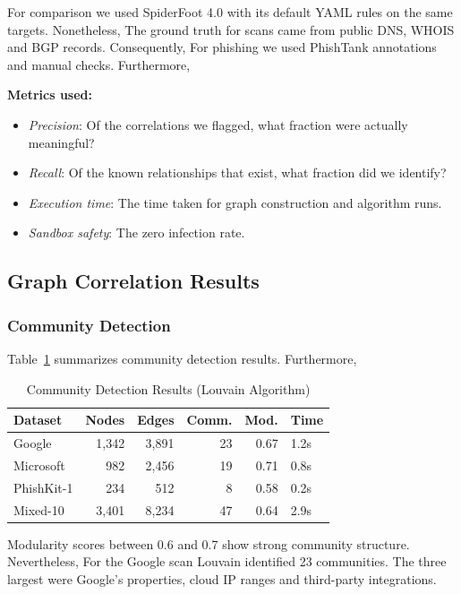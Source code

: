 \documentclass[conference]{IEEEtran}
\begin{document}
For comparison we used SpiderFoot 4.0 with its default YAML rules on the same targets. Nonetheless, The ground truth for scans came from public DNS, WHOIS and BGP records. Consequently, For phishing we used PhishTank annotations and manual checks. Furthermore,

\textbf{Metrics used:}
\begin{itemize}
\item \textit{Precision}: Of the correlations we flagged, what fraction were actually meaningful?
\item \textit{Recall}: Of the known relationships that exist, what fraction did we identify?
\item \textit{Execution time}: The time taken for graph construction and algorithm runs.
\item \textit{Sandbox safety}: The zero infection rate.
\end{itemize}

\subsection{Graph Correlation Results}

\subsubsection{Community Detection}

Table~\ref{tab:community_results} summarizes community detection results. Furthermore,

\begin{table}[htbp]
\centering
\caption{Community Detection Results (Louvain Algorithm)}
\label{tab:community_results}
\begin{tabular}{@{}lrrrrl@{}}
\toprule
\textbf{Dataset} & \textbf{Nodes} & \textbf{Edges} & \textbf{Comm.} & \textbf{Mod.} & \textbf{Time} \\
\midrule
Google & 1,342 & 3,891 & 23 & 0.67 & 1.2s \\
Microsoft & 982 & 2,456 & 19 & 0.71 & 0.8s \\
PhishKit-1 & 234 & 512 & 8 & 0.58 & 0.2s \\
Mixed-10 & 3,401 & 8,234 & 47 & 0.64 & 2.9s \\
\bottomrule
\end{tabular}
\end{table}

Modularity scores between 0.6 and 0.7 show strong community structure. Nevertheless, For the Google scan Louvain identified 23 communities. The three largest were Google's properties, cloud IP ranges and third-party integrations.
\end{document}
